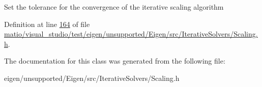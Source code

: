 Set the tolerance for the convergence of the iterative scaling algorithm 

Definition at line \hyperlink{matio_2visual__studio_2test_2eigen_2unsupported_2_eigen_2src_2_iterative_solvers_2_scaling_8h_source_l00164}{164} of file \hyperlink{matio_2visual__studio_2test_2eigen_2unsupported_2_eigen_2src_2_iterative_solvers_2_scaling_8h_source}{matio/visual\+\_\+studio/test/eigen/unsupported/\+Eigen/src/\+Iterative\+Solvers/\+Scaling.\+h}.



The documentation for this class was generated from the following file\+:\begin{DoxyCompactItemize}
\item 
eigen/unsupported/\+Eigen/src/\+Iterative\+Solvers/\+Scaling.\+h\end{DoxyCompactItemize}
